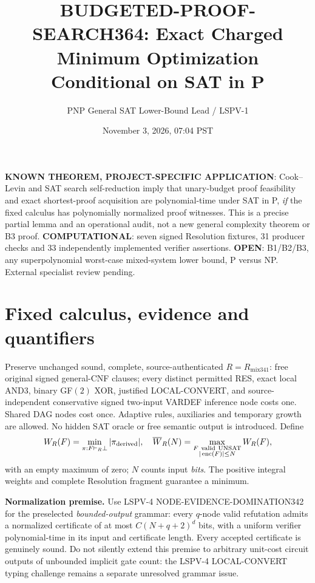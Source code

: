 \documentclass[11pt]{article}
\title{BUDGETED-PROOF-SEARCH364: Exact Charged Minimum Optimization Conditional on SAT in P}
\author{PNP General SAT Lower-Bound Lead / LSPV-1}
\date{November 3, 2026, 07:04 PST}
\begin{document}
\maketitle

\noindent\textbf{KNOWN THEOREM, PROJECT-SPECIFIC APPLICATION}: Cook--Levin and SAT search self-reduction imply that unary-budget proof feasibility and exact shortest-proof acquisition are polynomial-time under SAT in P, \emph{if} the fixed calculus has polynomially normalized proof witnesses. This is a precise partial lemma and an operational audit, not a new general complexity theorem or B3 proof. \textbf{COMPUTATIONAL}: seven signed Resolution fixtures, 31 producer checks and 33 independently implemented verifier assertions. \textbf{OPEN}: B1/B2/B3, any superpolynomial worst-case mixed-system lower bound, P versus NP. External specialist review pending.

\section*{Fixed calculus, evidence and quantifiers}
Preserve unchanged sound, complete, source-authenticated $R=R_{\mathrm{mix341}}$: free original signed general-CNF clauses; every distinct permitted RES, exact local AND3, binary GF$(2)$ XOR, justified LOCAL-CONVERT, and source-independent conservative signed two-input VARDEF inference node costs one. Shared DAG nodes cost once. Adaptive rules, auxiliaries and temporary growth are allowed. No hidden SAT oracle or free semantic output is introduced. Define
\[
W_R(F)=\min_{\pi:F\vdash_R\bot}|\pi_{\rm derived}|,\quad
\overline W_R(N)=\max_{\substack{F\ {\rm valid\ UNSAT}\\|\operatorname{enc}(F)|\le N}}W_R(F),
\]
with an empty maximum of zero; $N$ counts input \emph{bits}. The positive integral weights and complete Resolution fragment guarantee a minimum.

\textbf{Normalization premise.} Use LSPV-4 NODE-EVIDENCE-DOMINATION342 for the preselected \emph{bounded-output} grammar: every $q$-node valid refutation admits a normalized certificate of at most $C(N+q+2)^d$ bits, with a uniform verifier polynomial-time in its input and certificate length. Every accepted certificate is genuinely sound. Do not silently extend this premise to arbitrary unit-cost circuit outputs of unbounded implicit gate count: the LSPV-4 LOCAL-CONVERT typing challenge remains a separate unresolved grammar issue.
\end{document}
